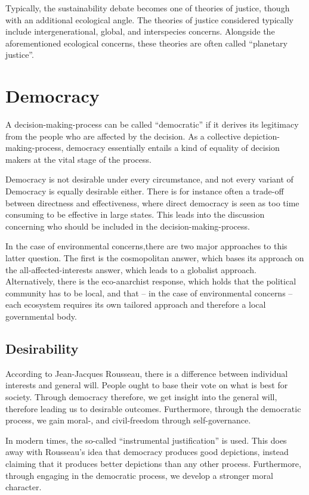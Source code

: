 \documentclass[12pt]{report}
\begin{document}
Typically, the sustainability debate becomes one of theories of justice, though
with an additional ecological angle. The theories of justice considered
typically include intergenerational, global, and interspecies concerns.
Alongside the aforementioned ecological concerns, these theories are often
called ``planetary justice''.

\chapter{Democracy}

A decision-making-process can be called ``democratic'' if it derives its
legitimacy from the people who are affected by the decision. As a collective
depiction-making-process, democracy essentially entails a kind of equality of
decision makers at the vital stage of the process.

Democracy is not desirable under every circumstance, and not every variant of
Democracy is equally desirable either. There is for instance often a trade-off
between directness and effectiveness, where direct democracy is seen as too time
consuming to be effective in large states. This leads into the discussion
concerning who should be included in the decision-making-process.

In the case of environmental concerns,there are two major approaches to this
latter question. The first is the cosmopolitan answer, which bases its approach
on the all-affected-interests answer, which leads to a globalist approach.
Alternatively, there is the eco-anarchist response, which holds that the
political community has to be local, and that -- in the case of environmental
concerns -- each ecosystem requires its own tailored approach and therefore a
local governmental body.

\section{Desirability}

According to Jean-Jacques Rousseau, there is a difference between individual
interests and general will. People ought to base their vote on what is best for
society. Through democracy therefore, we get insight into the general will,
therefore leading us to desirable outcomes. Furthermore, through the democratic
process, we gain moral-, and civil-freedom through self-governance.

In modern times, the so-called ``instrumental justification'' is used. This does
away with Rousseau's idea that democracy produces good depictions, instead
claiming that it produces better depictions than any other process. Furthermore,
through engaging in the democratic process, we develop a stronger moral
character.
\end{document}
